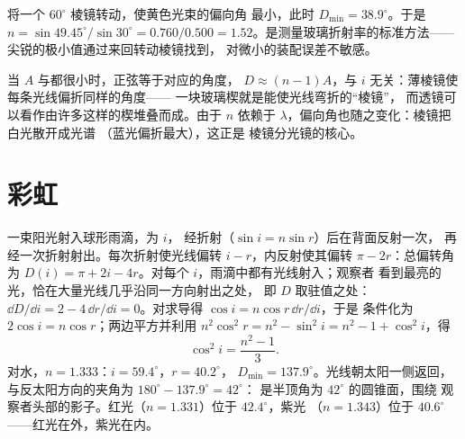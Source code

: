 \begin{example}[测量折射率]\label{ex:b1:rays-reflection-refraction:prismnum}
将一个 $60^\circ$ 棱镜转动，使黄色光束的偏向角
最小，此时 $D_{\min} = 38.9^\circ$。于是 $n = \sin 49.45^\circ/\sin 30^\circ
= 0.760/0.500 = 1.52$。是测量玻璃折射率的标准方法——
尖锐的极小值通过来回转动棱镜找到，
对微小的装配误差不敏感。
\end{example}

\begin{remark}[薄棱镜与分光镜]\label{rem:b1:rays-reflection-refraction:thin}
当 $A$ 与都很小时，正弦等于对应的角度，
$D \approx (n - 1)A$，与 $i$ 无关：薄棱镜使每条光线偏折同样的角度——
一块玻璃楔就是能使光线弯折的“棱镜”，
而透镜可以看作由许多这样的楔堆叠而成。由于
$n$ 依赖于 $\lambda$，偏向角也随之变化：棱镜把白光散开成光谱
（蓝光偏折最大），这正是
棱镜分光镜的核心。
\end{remark}

\section{彩虹}

\begin{example}[笛卡儿的彩虹]\label{ex:b1:rays-reflection-refraction:rainbow}
一束阳光射入球形雨滴，为 $i$，
经折射（$\sin i = n\sin r$）后在背面反射一次，
再经一次折射射出。每次折射使光线偏转
$i - r$，内反射使其偏转 $\pi - 2r$：总偏转角
为 $D(i) = \pi + 2i - 4r$。对每个 $i$，雨滴中都有光线射入；观察者
看到最亮的光，恰在大量光线几乎沿同一方向射出之处，
即 $D$ 取驻值之处：$\dd D/\dd i = 2 - 4\,\dd r/\dd i
= 0$。对求导得 $\cos i = n\cos r\,\dd r/\dd i$，于是
条件化为 $2\cos i = n\cos r$；两边平方并利用
$n^2\cos^2 r = n^2 - \sin^2 i = n^2 - 1 + \cos^2 i$，得
\[
\cos^2 i = \frac{n^2 - 1}{3} .
\]
对水，$n = 1.333$：$i = 59.4^\circ$，$r = 40.2^\circ$，
$D_{\min} = 137.9^\circ$。光线朝太阳一侧返回，
与反太阳方向的夹角为 $180^\circ - 137.9^\circ = 42^\circ$：
是半顶角为 $42^\circ$ 的圆锥面，围绕
观察者头部的影子。红光（$n = 1.331$）位于 $42.4^\circ$，紫光
（$n = 1.343$）位于 $40.6^\circ$——红光在外，紫光在内。
\end{example}

